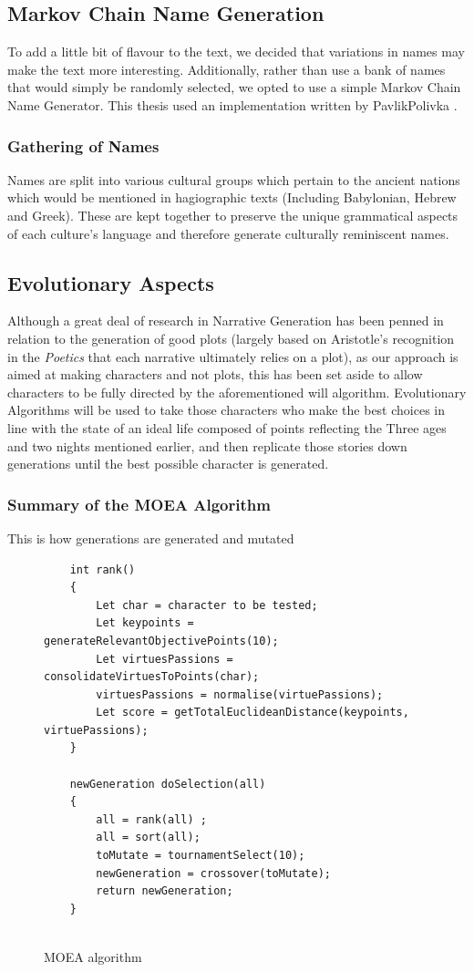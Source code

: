 \documentclass[11pt]{article}
\begin{document}
\subsection{Markov Chain Name Generation}
To add a little bit of flavour to the text, we decided that variations in names may make the text more interesting. Additionally, rather than use a bank of names that would simply be randomly selected, we opted to use a simple Markov Chain Name Generator. This thesis used an implementation written by PavlikPolivka \cite{PavlikPo78:online}.\\
\subsubsection{Gathering of Names}
Names are split into various cultural groups which pertain to the ancient nations which would be mentioned in hagiographic texts (Including Babylonian, Hebrew and Greek). These are kept together to preserve the unique grammatical aspects of each culture's language and therefore generate culturally reminiscent names. 

\subsection{Evolutionary Aspects}
Although a great deal of research in Narrative Generation has been penned in relation to the generation of good plots (largely based on Aristotle's recognition in the \textit{Poetics} that each narrative ultimately relies on a plot), as our approach is aimed at making characters and not plots, this has been set aside to allow characters to be fully directed by the aforementioned will algorithm. Evolutionary Algorithms will be used to take those characters who make the best choices in line with the state of an ideal life composed of points reflecting the Three ages and two nights mentioned earlier, and then replicate those stories down generations until the best possible character is generated. 

\subsubsection{Summary of the MOEA Algorithm}
This is how generations are generated and mutated\:
\begin{figure}
\begin{lstlisting}
	int rank()
	{
		Let char = character to be tested;
		Let keypoints = generateRelevantObjectivePoints(10);
		Let virtuesPassions = consolidateVirtuesToPoints(char);
		virtuesPassions = normalise(virtuePassions);
		Let score = getTotalEuclideanDistance(keypoints, 			virtuePassions);
	}
	
	newGeneration doSelection(all)
	{
		all = rank(all) ;
		all = sort(all);
		toMutate = tournamentSelect(10);
		newGeneration = crossover(toMutate);
		return newGeneration;
	}
	

\end{lstlisting}
\caption{MOEA algorithm}
\end{figure}
\end{document}
